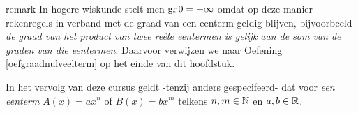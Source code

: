 \documentclass{ximera}
\begin{document}














\begin{expandable}{remark}
In hogere wiskunde stelt men $\operatorname{gr} 0 = - \infty$ omdat op deze manier rekenregels in verband met de graad van een eenterm geldig blijven, bijvoorbeeld 
\textit{ de graad van het product van twee reële eentermen is gelijk aan de som van de graden van die eentermen}. Daarvoor verwijzen we naar Oefening \ref{oefgraadnulveelterm} op het einde van dit hoofdstuk.
\end{expandable}


\begin{notation}

	In het vervolg van deze cursus geldt -tenzij anders gespecifeerd- dat voor \textit{ een eenterm} $A(x) = ax^n$ of $B(x) = bx^m$ telkens $n,m\in \mathbb{N}$ en $a,b\in \mathbb{R}$.
\end{notation}
	
\end{document}
